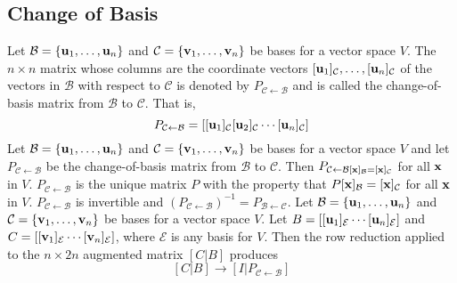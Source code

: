 \documentclass{article}
\begin{document}
    \subsection{Change of Basis}
    \begin{outline}
        \1 Let \(\mathcal B=\{\vb u_1,\ldots,\vb u_n\}\) and \(\mathcal C=\{\vb v_1,\ldots,\vb v_n\}\) be bases for a vector space $V$. The \(n\times n\) matrix whose columns are the coordinate vectors \([\vb u_1]_\mathcal C,\ldots,[\vb u_n]_\mathcal C\) of the vectors in \(\mathcal B\) with respect to \(\mathcal C\) is denoted by \(P_{\mathcal C\leftarrow\mathcal B}\) and is called the change-of-basis matrix from \(\mathcal B\) to \(\mathcal C\). That is, \[P_{\mathcal C\leftarrow\mathcal B}=[[\vb u_1]_\mathcal C[\vb u_2]_\mathcal C\cdots[\vb u_n]_\mathcal C]\]
        \1 Let \(\mathcal B=\{\vb u_1,\ldots,\vb u_n\}\) and \(\mathcal C=\{\vb v_1,\ldots,\vb v_n\}\) be bases for a vector space $V$ and let \(P_{\mathcal C\leftarrow\mathcal B}\) be the change-of-basis matrix from \(\mathcal B\) to \(\mathcal C\). Then 
            \2 \(P_{\mathcal C\leftarrow\mathcal B[\vb x]_\mathcal B=[\vb x]_\mathcal{C}}\) for all \(\vb x\) in $V$. 
            \2 \(P_{\mathcal C\leftarrow\mathcal B}\) is the unique matrix $P$ with the property that \(P[\vb x]_\mathcal B=[\vb x]_\mathcal C\) for all \(\vb x\) in $V$. 
            \2 \(P_{\mathcal C\leftarrow\mathcal B}\) is invertible and \((P_{\mathcal C\leftarrow\mathcal B})^{-1}=P_{\mathcal B\leftarrow\mathcal C}\). 
        \1 Let \(\mathcal B=\{\vb u_1,\ldots,\vb u_n\}\) and \(\mathcal C=\{\vb v_1,\ldots,\vb v_n\}\) be bases for a vector space $V$. Let \(B=[[\vb u_1]_\mathcal E\cdots[\vb u_n]_\mathcal E]\) and \(C=[[\vb v_1]_\mathcal E\cdots[\vb v_n]_\mathcal E]\), where \(\mathcal E\) is any basis for $V$. Then the row reduction applied to the \(n\times 2n\) augmented matrix \([C|B]\) produces \[[C|B]\to[I|P_{\mathcal C\leftarrow\mathcal B}]\]

    \end{outline}
\end{document}
